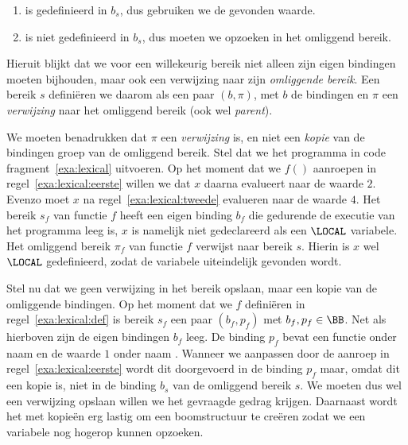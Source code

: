 \begin{enumerate}
  \item {} is gedefinieerd in $b_s$, dus gebruiken we de gevonden waarde.
  \item {} is niet gedefinieerd in $b_s$, dus moeten we  opzoeken in het omliggend bereik.
\end{enumerate}

Hieruit blijkt dat we voor een willekeurig bereik niet alleen zijn eigen bindingen moeten bijhouden, maar ook een verwijzing naar zijn \emph{omliggende bereik}. Een bereik $s$ definiëren we daarom als een paar $(b, \pi)$, met $b$ de bindingen en $\pi$ een \emph{verwijzing} naar het omliggend bereik (ook wel \emph{parent}).

We moeten benadrukken dat $\pi$ een \emph{verwijzing} is, en niet een \emph{kopie} van de bindingen groep van de omliggend bereik. Stel dat we het programma in code fragment~\ref{exa:lexical} uitvoeren. Op het moment dat we $f()$ aanroepen in regel~\ref{exa:lexical:eerste} willen we dat $x$ daarna evalueert naar de waarde $2$. Evenzo moet $x$ na regel~\ref{exa:lexical:tweede} evalueren naar de waarde $4$. Het bereik $s_f$ van functie $f$ heeft een eigen binding $b_f$ die gedurende de executie van het programma leeg is, $x$ is namelijk niet gedeclareerd als een $\LOCAL$ variabele. Het omliggend bereik $\pi_f$ van functie $f$ verwijst naar bereik $s$. Hierin is $x$ wel $\LOCAL$ gedefinieerd, zodat de variabele uiteindelijk gevonden wordt.

\begin{NoBreak}
  \codeFragmentCaption
\end{NoBreak}

Stel nu dat we geen verwijzing in het bereik opslaan, maar een kopie van de omliggende bindingen. Op het moment dat we $f$ definiëren in regel~\ref{exa:lexical:def} is bereik $s_f$ een paar $(b_f, p_f)$ met $b_f,p_f \in \BB$. Net als hierboven zijn de eigen bindingen $b_f$ leeg. De binding $p_f$ bevat een functie onder naam  en de waarde $1$ onder naam . Wanneer we  aanpassen door de aanroep in regel~\ref{exa:lexical:eerste} wordt dit doorgevoerd in de binding $p_f$ maar, omdat dit een kopie is, niet in de binding $b_s$ van de omliggend bereik $s$. We moeten dus wel een verwijzing opslaan willen we het gevraagde gedrag krijgen. Daarnaast wordt het met kopieën erg lastig om een boomstructuur te creëren zodat we een variabele nog hogerop kunnen opzoeken.

